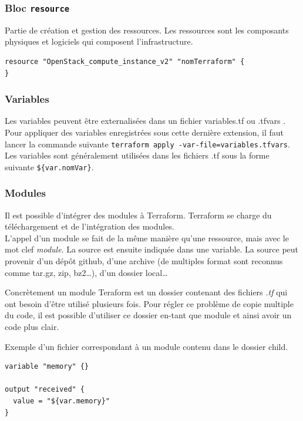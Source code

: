 \documentclass[]{article}
\begin{document}
\subsubsection{\texorpdfstring{Bloc
\textbf{\texttt{resource}}}{Bloc resource}}\label{bloc-resource}

Partie de création et gestion des ressources. Les ressources sont les composants physiques et logiciels qui composent l'infrastructure.

\begin{verbatim}
resource "OpenStack_compute_instance_v2" "nomTerraform" {
}
\end{verbatim}

\subsubsection{Variables}\label{variables}

Les variables peuvent être externalisées dans un fichier
\og variables.tf \fg ou \og
.tfvars \fg. Pour appliquer des variables enregistrées
sous cette dernière extension, il faut lancer la commande suivante
\texttt{terraform\ apply\ -var-file=variables.tfvars}. Les variables sont
généralement utilisées dans les fichiers .tf sous la forme suivante
\texttt{\$\{var.nomVar\}}.

\subsubsection{Modules}\label{modules}

Il est possible d'intégrer des modules à Terraform. Terraform se charge
du téléchargement et de l'intégration des modules. \\
L'appel d'un module
se fait de la même manière qu'une ressource, mais avec le mot clef
\emph{module}. La source est ensuite indiquée dans une variable. La
source peut provenir d'un dépôt github, d'une archive (de multiples
format sont reconnus comme tar.gz, zip, bz2\ldots{}), d'un dossier
local\ldots{} 

Concrètement un module Teraform est un dossier contenant
des fichiers \emph{.tf} qui ont besoin d'être utilisé plusieurs fois.
Pour régler ce problème de copie multiple du code, il est possible
d'utiliser ce dossier en-tant que module et ainsi avoir un code plus
clair.

Exemple d'un fichier correspondant à un module contenu dans le dossier child.
\begin{verbatim}
variable "memory" {}

output "received" {
  value = "${var.memory}"
}
\end{verbatim}
\end{document}
